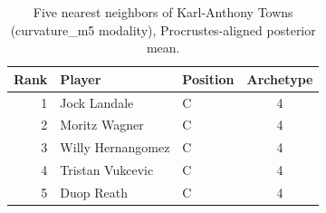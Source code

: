 \begin{table}[htbp]
  \centering\small
  \begin{tabular}{rllc}
    \toprule
    Rank & Player & Position & Archetype \\
    \midrule
    1 & Jock Landale & C & 4 \\
    2 & Moritz Wagner & C & 4 \\
    3 & Willy Hernangomez & C & 4 \\
    4 & Tristan Vukcevic & C & 4 \\
    5 & Duop Reath & C & 4 \\
    \bottomrule
  \end{tabular}
  \caption{Five nearest neighbors of Karl-Anthony Towns (curvature_m5 modality), Procrustes-aligned posterior mean.}
  \label{tab:Karl_Anthony_Towns_neighbors_curvature_m5}
\end{table}

